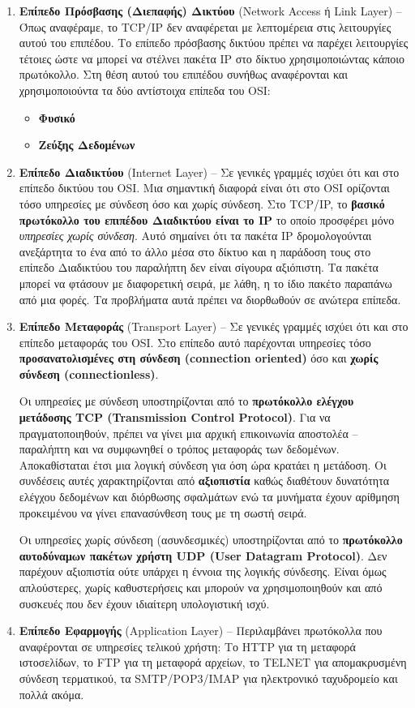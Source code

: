\begin{enumerate}
\item \textbf{Επίπεδο Πρόσβασης (Διεπαφής) Δικτύου} (Network Access ή Link Layer) -- Όπως αναφέραμε, το TCP/IP δεν αναφέρεται με λεπτομέρεια στις λειτουργίες αυτού του επιπέδου. Το επίπεδο πρόσβασης δικτύου πρέπει να παρέχει λειτουργίες τέτοιες ώστε να μπορεί να στέλνει πακέτα IP στο δίκτυο χρησιμοποιώντας κάποιο πρωτόκολλο. Στη θέση αυτού του επιπέδου συνήθως αναφέρονται και χρησιμοποιούντα τα δύο αντίστοιχα επίπεδα του OSI:
  \begin{itemize}
     \item \textbf{Φυσικό}
     \item \textbf{Ζεύξης Δεδομένων}
  \end{itemize}
\item \textbf{Επίπεδο Διαδικτύου} (Internet Layer) -- Σε γενικές γραμμές ισχύει ότι και στο επίπεδο δικτύου του OSI. Μια σημαντική διαφορά είναι ότι στο OSI ορίζονται τόσο υπηρεσίες με σύνδεση όσο και χωρίς σύνδεση. Στο TCP/IP, το \textbf{βασικό πρωτόκολλο του επιπέδου Διαδικτύου είναι το IP} το οποίο προσφέρει μόνο \emph{υπηρεσίες χωρίς σύνδεση}. Αυτό σημαίνει ότι τα πακέτα IP δρομολογούνται ανεξάρτητα το ένα από το άλλο μέσα στο δίκτυο και η παράδοση τους στο επίπεδο Διαδικτύου του παραλήπτη δεν είναι σίγουρα αξιόπιστη. Τα πακέτα μπορεί να φτάσουν με διαφορετική σειρά, με λάθη, η το ίδιο πακέτο παραπάνω από μια φορές. Τα προβλήματα αυτά πρέπει να διορθωθούν σε ανώτερα επίπεδα.
\item \textbf{Επίπεδο Μεταφοράς} (Transport Layer) -- Σε γενικές γραμμές ισχύει ότι και στο επίπεδο μεταφοράς του OSI. Στο επίπεδο αυτό παρέχονται υπηρεσίες τόσο \textbf{προσανατολισμένες στη σύνδεση (connection oriented)} όσο και \textbf{χωρίς σύνδεση (connectionless)}.

Οι υπηρεσίες με σύνδεση υποστηρίζονται από το \textbf{πρωτόκολλο ελέγχου μετάδοσης TCP (Transmission Control Protocol)}. Για να πραγματοποιηθούν, πρέπει να γίνει μια αρχική επικοινωνία αποστολέα -- παραλήπτη και να συμφωνηθεί ο τρόπος μεταφοράς των δεδομένων. Αποκαθίσταται έτσι μια λογική σύνδεση για όση ώρα κρατάει η μετάδοση. Οι συνδέσεις αυτές χαρακτηρίζονται από \textbf{αξιοπιστία} καθώς διαθέτουν δυνατότητα ελέγχου δεδομένων και διόρθωσης σφαλμάτων ενώ τα μυνήματα έχουν αρίθμηση προκειμένου να γίνει επανασύνθεση τους με τη σωστή σειρά. 

Οι υπηρεσίες χωρίς σύνδεση (ασυνδεσμικές) υποστηρίζονται από το \textbf{πρωτόκολλο αυτοδύναμων πακέτων χρήστη UDP (User Datagram Protocol)}. Δεν παρέχουν αξιοπιστία ούτε υπάρχει η έννοια της λογικής σύνδεσης. Είναι όμως απλούστερες, χωρίς καθυστερήσεις και μπορούν να χρησιμοποιηθούν και από συσκευές που δεν έχουν ιδιαίτερη υπολογιστική ισχύ.
\item \textbf{Επίπεδο Εφαρμογής} (Application Layer) -- Περιλαμβάνει πρωτόκολλα που αναφέρονται σε υπηρεσίες τελικού χρήστη: Το HTTP για τη μεταφορά ιστοσελίδων, το FTP για τη μεταφορά αρχείων, το TELNET για απομακρυσμένη σύνδεση τερματικού, τα SMTP/POP3/IMAP για ηλεκτρονικό ταχυδρομείο και πολλά ακόμα. 
\end{enumerate}


